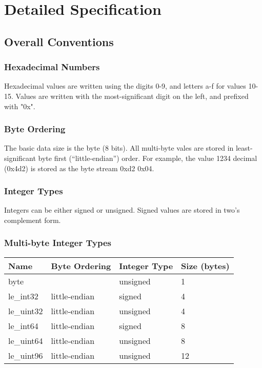 \documentclass[10pt]{article}
\begin{document}
\section{Detailed Specification}
\subsection{Overall Conventions}
\subsubsection{Hexadecimal Numbers}
Hexadecimal values are written using the digits 0-9, and letters a-f for values 10-15.
Values are written with the most-significant digit on the left, and prefixed with "0x".

\subsubsection{Byte Ordering}
The basic data size is the byte (8 bits).
All multi-byte vales are stored in least-significant byte first (``little-endian'') order.
For example, the value 1234 decimal (0x4d2) is stored as the byte stream 0xd2 0x04.

\subsubsection{Integer Types}
Integers can be either signed or unsigned.
Signed values are stored in two's complement form.

\subsubsection{Multi-byte Integer Types}
\begin{center}
\begin{tabular}{l l l l}
\hline
\textbf{Name} & \textbf{Byte Ordering} & \textbf{Integer Type} & \textbf{Size (bytes)} \\
\hline
byte & & unsigned & 1 \\
le\_int32 & little-endian & signed & 4 \\
le\_uint32 & little-endian & unsigned & 4 \\
le\_int64 & little-endian & signed & 8 \\
le\_uint64 & little-endian & unsigned & 8 \\
le\_uint96 & little-endian & unsigned & 12 \\
\end{tabular}
\end{center}
\end{document}
